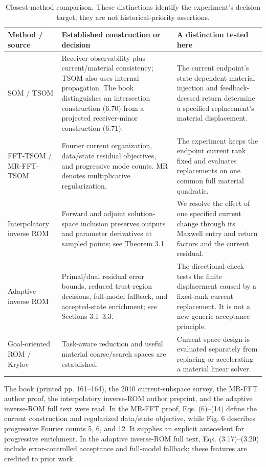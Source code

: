 \documentclass[11pt]{article}
\begin{document}
\begin{table}[htbp]\centering\small
\begin{tabularx}{\linewidth}{p{.19\linewidth}X X}\toprule
Method / source&Established construction or decision&A distinction tested here\\\midrule
SOM / TSOM \cite{r18,r17,r3,r16}&Receiver observability plus current/material consistency; TSOM also uses internal propagation. The book distinguishes an intersection construction (6.70) from a projected receiver-minor construction (6.71).&The current endpoint's state-dependent material injection and feedback-dressed return determine a specified replacement's material displacement.\\
FFT-TSOM / MR-FFT-TSOM \cite{r1,r19,r3}&Fourier current organization, data/state residual objectives, and progressive mode counts. MR denotes multiplicative regularization.&The experiment keeps the endpoint current rank fixed and evaluates replacements on one common full material quadratic.\\
Interpolatory inverse ROM \cite{r4}&Forward and adjoint solution-space inclusion preserves outputs and parameter derivatives at sampled points; see Theorem 3.1.&We resolve the effect of one specified current change through its Maxwell entry and return factors and the current residual.\\
Adaptive inverse ROM \cite{r5}&Primal/dual residual error bounds, reduced trust-region decisions, full-model fallback, and accepted-state enrichment; see Sections 3.1--3.3.&The directional check tests the finite displacement caused by a fixed-rank current replacement. It is not a new generic acceptance principle.\\
Goal-oriented ROM / Krylov \cite{r6,r8}&Task-aware reduction and useful material coarse/search spaces are established.&Current-space design is evaluated separately from replacing or accelerating a material linear solver.\\\bottomrule
\end{tabularx}
\caption{Closest-method comparison. These distinctions identify the experiment's decision target; they are not historical-priority assertions.}
\end{table}

The book (printed pp. 161--164), the 2010 current-subspace survey, the MR-FFT author proof, the interpolatory inverse-ROM author preprint, and the adaptive inverse-ROM full text were read. In the MR-FFT proof, Eqs. (6)--(14) define the current construction and regularized data/state objective, while Fig. 6 describes progressive Fourier counts 5, 6, and 12. It supplies an explicit antecedent for progressive enrichment. In the adaptive inverse-ROM full text, Eqs. (3.17)--(3.20) include error-controlled acceptance and full-model fallback; these features are credited to prior work.
\end{document}
